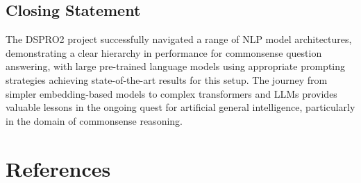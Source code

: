 \documentclass[10.5pt]{article}
\begin{document}
\subsection{Closing Statement}
The DSPRO2 project successfully navigated a range of NLP model architectures, demonstrating a clear hierarchy in performance for commonsense question answering, with large pre-trained language models using appropriate prompting strategies achieving state-of-the-art results for this setup. The journey from simpler embedding-based models to complex transformers and LLMs provides valuable lessons in the ongoing quest for artificial general intelligence, particularly in the domain of commonsense reasoning.

\newpage
\section*{References}
\end{document}
